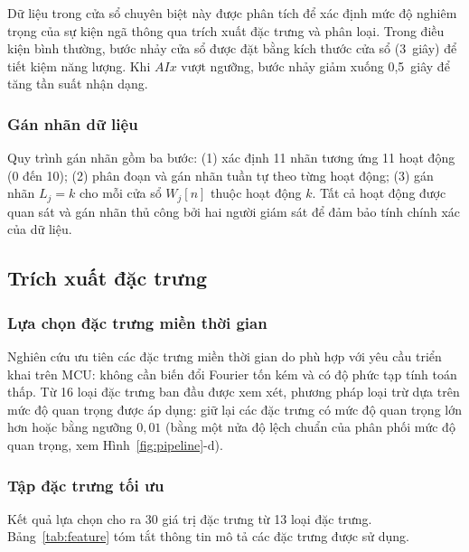 Dữ liệu trong cửa sổ chuyên biệt này được phân tích để xác định mức độ nghiêm trọng của sự kiện ngã thông qua trích xuất đặc trưng và phân loại. Trong điều kiện bình thường, bước nhảy cửa sổ được đặt bằng kích thước cửa sổ (3~giây) để tiết kiệm năng lượng. Khi $AIx$ vượt ngưỡng, bước nhảy giảm xuống 0,5~giây để tăng tần suất nhận dạng.

\subsubsection{Gán nhãn dữ liệu}

Quy trình gán nhãn gồm ba bước: (1) xác định 11 nhãn tương ứng 11 hoạt động (0 đến 10); (2) phân đoạn và gán nhãn tuần tự theo từng hoạt động; (3) gán nhãn $L_j = k$ cho mỗi cửa sổ $W_j[n]$ thuộc hoạt động $k$. Tất cả hoạt động được quan sát và gán nhãn thủ công bởi hai người giám sát để đảm bảo tính chính xác của dữ liệu.

\subsection{Trích xuất đặc trưng}

\subsubsection{Lựa chọn đặc trưng miền thời gian}

Nghiên cứu ưu tiên các đặc trưng miền thời gian do phù hợp với yêu cầu triển khai trên MCU: không cần biến đổi Fourier tốn kém và có độ phức tạp tính toán thấp. Từ 16 loại đặc trưng ban đầu được xem xét, phương pháp loại trừ dựa trên mức độ quan trọng được áp dụng: giữ lại các đặc trưng có mức độ quan trọng lớn hơn hoặc bằng ngưỡng $0{,}01$ (bằng một nửa độ lệch chuẩn của phân phối mức độ quan trọng, xem Hình~\ref{fig:pipeline}-d).

\subsubsection{Tập đặc trưng tối ưu}

Kết quả lựa chọn cho ra 30 giá trị đặc trưng từ 13 loại đặc trưng. Bảng~\ref{tab:feature} tóm tắt thông tin mô tả các đặc trưng được sử dụng.

